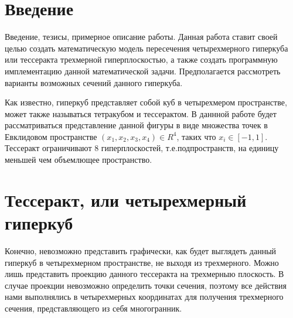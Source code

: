 \documentclass[12pt, a4paper, twoside]{report}
\begin{document}

\tableofcontents

\newpage
\section{Введение}
Введение, тезисы, примерное описание работы.
Данная работа ставит своей целью создать математическую модель пересечения четырехмерного гиперкуба или тессеракта трехмерной гиперплоскостью, а также создать программную имплементацию данной математической задачи. Предполагается рассмотреть варианты возможных сечений данного гиперкуба.

Как известно, гиперкуб представляет собой куб в четырехмером пространстве, может также называться тетракубом и тессерактом. В даннной работе будет рассматриваться представление данной фигуры в виде множества точек в Евклидовом пространстве $(x_1,x_2,x_3,x_4) \in R^4$, таких что $ x_i\in [ -1,1 ].$ Тессеракт ограничивают 8 гиперплоскостей, т.е.подпространств, на единицу меньшей чем объемлющее пространство.

\begin{figure}[h!]
	\center
	\clearpage
\end{figure}
\section{Тессеракт, или четырехмерный гиперкуб}
Конечно, невозможно представить графически, как будет выглядеть данный гиперкуб в четырехмерном пространстве, не выходя из трехмерного. Можно лишь представить проекцию данного тессеракта на трехмерныю плоскость. В случае проекции невозможно определить точки сечения, поэтому все действия нами выполнялись в четырехмерных координатах для получения трехмерного сечения, представляющего из себя многогранник.
\end{document}
